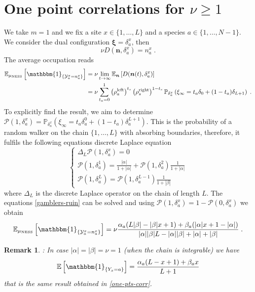 \documentclass[10pt]{article}
\numberwithin{equation}{section}
\numberwithin{equation}{subsection}
\newtheorem{remark}{Remark}
\newcommand{\dt}{\;.}
\begin{document}
\section{One point correlations for $\nu\geq 1$}\label{appendix-1pts-general}
We take $m=1$ and we fix a site $x\in\{1,\ldots,L\}$ and a species $a\in \{1,\ldots,N-1\}$. We consider the dual configuration $\bm{\xi}=\delta_{a}^{x}$, then 
\begin{equation}
	\nu D(\bm{n},\delta_{a}^{x})=n_{a}^{x}\dt
\end{equation}
The average occupation reads
\begin{equation}\label{OnePtsCORR}
	\begin{split}
			\mathbb{E}_{\mu_{\text{NESS}}}\left[\mathbbm{1}_{\{\mathcal{Y}_{a}^{x}=n_{a}^{x}\}}\right]&=\nu\lim_{t\to\infty}\mathbb{E}_{\bm{n}}\left[D(\bm{n}(t),\delta_{a}^{x})\right]\\&=\nu\sum_{t_{a}=0}^{1}\left(\rho_{a}^{\text{left}}\right)^{t_{s}}\left(\rho_{s}^{\text{right}}\right)^{1-t_{s}}\mathbb{P}_{\delta_{a}^{x}}\left(\xi_{\infty}=t_{a}\delta_{0}+(1-t_{a})\delta_{L+1}\right)\dt
	\end{split}
\end{equation}
To explicitly find the result, we aim to determine $\mathcal{P}(1,\delta_{a}^{x})=\mathbb{P}_{\delta_{a}^{x}}\left(\xi_{\infty}=t_{a}\delta_{a}^{0}+(1-t_{a})\delta_{a}^{L+1}\right)$. This is the probability of a random walker on the chain $\{1,\ldots,L\}$ with absorbing boundaries, therefore, it fulfils the following equations discrete Laplace equation
\begin{equation}\label{gamblers-ruin}
	\begin{cases}
		\Delta_{L}\mathcal{P}(1,\delta_{a}^{x})=0\\
		\mathcal{P}(1,\delta_{a}^{1})=\frac{|\alpha|}{1+|\alpha|}+\mathcal{P}(1,\delta_{a}^{2})\frac{1}{1+|\alpha|}\\
		\mathcal{P}(1,\delta_{a}^{L})=\mathcal{P}(1,\delta_{a}^{L-1})\frac{1}{1+|\beta|}
	\end{cases}
\end{equation}
where $\Delta_{L}$ is the discrete Laplace operator on the chain of length $L$. The equations \eqref{gamblers-ruin} can be solved and using $\mathcal{P}(1,\delta_{a}^{x})=1-\mathcal{P}(0,\delta_{a}^{x})$ we obtain 
\begin{equation}
	\mathbb{E}_{\mu_{\text{NESS}}}\left[\mathbbm{1}_{\{\mathcal{Y}_{a}^{x}=n_{a}^{x}\}}\right]=\nu\frac{\alpha_{a}(L|\beta|-|\beta|x+1)+\beta_{a}(|\alpha|x+1-|\alpha|)}{|\alpha||\beta|L-|\alpha||\beta|+|\alpha|+|\beta|}\dt
\end{equation}
\begin{remark}: In case $|\alpha|=|\beta|=\nu=1$ (when the chain is integrable) we have 
\begin{equation}
		\mathbb{E}\left[\mathbbm{1}_{\{Y_{x}=a\}}\right]=\frac{\alpha_{a}(L-x+1)+\beta_{a}x}{L+1}
\end{equation}
that is the same result obtained in \eqref{one-pts-corr}.  
\end{remark}
\end{document}
